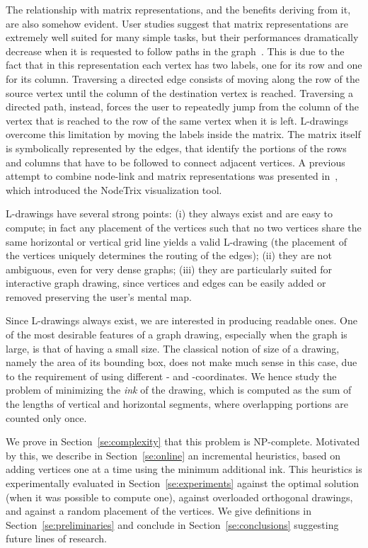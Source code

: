\documentclass{llncs}
\begin{document}
The relationship with matrix representations, and the benefits deriving from it, are also somehow evident. User studies suggest that matrix representations are extremely well suited for many simple tasks, but their performances dramatically decrease when it is requested to follow paths in the graph~\cite{dmpt-hvdgu-14,gfc-rgunm-05}. This is due to the fact that in this representation each vertex has two labels, one for its row and one for its column. Traversing a directed edge consists of moving along the row of the source vertex until the column of the destination vertex is reached. Traversing a directed path, instead, forces the user to repeatedly jump from the column of the vertex that is reached to the row of the same vertex when it is left. L-drawings overcome this limitation by moving the labels inside the matrix. The matrix itself is symbolically represented by the edges, that identify the portions of the rows and columns that have to be followed to connect adjacent vertices. A previous attempt to combine node-link and matrix representations was presented in~\cite{hfm-ntrix-07}, which introduced the NodeTrix visualization tool.

L-drawings have several strong points: (i) they always exist and are easy to compute; in fact any placement of the vertices such that no two vertices share the same horizontal or vertical grid line yields a valid L-drawing (the placement of the vertices uniquely determines the routing of the edges); (ii) they are not ambiguous, even for very dense graphs; (iii) they are particularly suited for interactive graph drawing, since vertices and edges can be easily added or removed preserving the user's mental map.

Since L-drawings always exist, we are interested in producing readable ones. One of the most desirable features of a graph drawing, especially when the graph is large, is that of having a small size. The classical notion of size of a drawing, namely the area of its bounding box, does not make much sense in this case, due to the requirement of using different - and -coordinates. We hence study the problem of minimizing the \emph{ink} of the drawing, which is computed as the sum of the lengths of vertical and horizontal segments, where overlapping portions are counted only once.

We prove in Section~\ref{se:complexity} that this problem is NP-complete. Motivated by this, we describe in Section~\ref{se:online} an incremental heuristics, based on adding vertices one at a time using the minimum additional ink. This heuristics is experimentally evaluated in Section~\ref{se:experiments} against the optimal solution (when it was possible to compute one), against overloaded orthogonal drawings, and against a random placement of the vertices. We give definitions in Section~\ref{se:preliminaries} and conclude in Section~\ref{se:conclusions} suggesting future lines of research.
\end{document}
